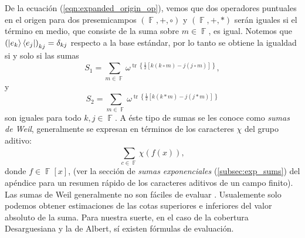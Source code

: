 \documentclass[a4paper,11pt]{report}
\DeclareMathOperator{\F}{\mathbb{F}}
\DeclareMathOperator{\tr}{tr}
\begin{document}
  De la ecuación (\ref{eqn:expanded_origin_op}), vemos que
  dos operadores puntuales en el origen para dos
  presemicampos $(\F,+,\circ)$ y $(\F,+,*)$ serán iguales si
  el término en medio, que consiste de la suma sobre $m \in
  \F$, es igual. Notemos que $\left( \ket{e_k}\bra{e_j}
  \right)_{kj} = \delta_{kj}$ respecto a la base estándar,
  por lo tanto se obtiene la igualdad si y solo si las sumas
  \begin{equation}
    \label{eqn:weil_sum_1}
    S_1 = \sum_{m \in \F}^{} 
    \omega^{\tr\left\{\frac{1}{2} [k(k\circ m) - j(j\circ
      m)]\right\}},
  \end{equation}
  y
  \begin{equation}
    \label{eqn:weil_sum_2}
    S_2 = \sum_{m \in \F}^{} 
    \omega^{\tr\left\{\frac{1}{2} [k(k*m) - j(j*m)]\right\}}
  \end{equation}
  son iguales para todo $k,j \in \F$.
  A éste tipo de sumas se les conoce como \textit{sumas de
    Weil}, generalmente se expresan en términos de los
  caracteres $\chi$ del grupo aditivo:
  \begin{equation}
    \sum_{c \in \F}^{} \chi(f(x)),
  \end{equation}
  donde $f \in \F[x]$, (ver la sección de \textit{sumas
  exponenciales} (\ref{subsec:exp_sums}) del apéndice para
  un resumen rápido de los caracteres aditivos de un campo
  finito). Las sumas de Weil generalmente no son fáciles de
  evaluar \cite{lidl1994}.  Usualemente solo podemos obtener
  estimaciones de las cotas superiores e inferiores del
  valor absoluto de la suma. Para nuestra suerte, en el caso
  de la cobertura Desarguesiana y la de Albert, sí existen
  fórmulas de evaluación.
\end{document}
